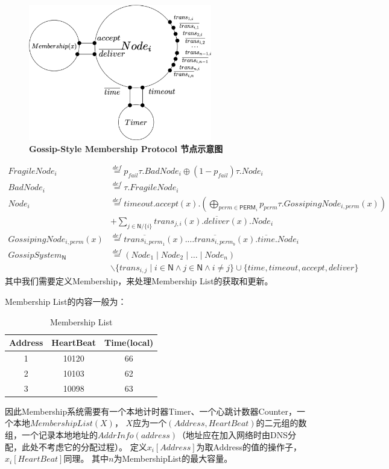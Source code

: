 \begin{figure}[!htbp]
	\small
	\centering
	\includegraphics[width=8cm]{../figure/Node.png}
    \caption{\textbf{Gossip-Style Membership Protocol 节点示意图}}
    \label{fig_membership_node}
\end{figure}
\begin{align*}
    FragileNode_i&\stackrel{def}{=}p_{fail}\tau.BadNode_i\oplus (1-p_{fail})\tau.Node_i\\
    BadNode_i&\stackrel{def}{=}\tau.FragileNode_i\\
    Node_i&\stackrel{def}{=}timeout.accept(x).(\bigoplus_{perm\in \mathsf{PERM}_i} p_{perm}\tau.GossipingNode_{i,perm}(x))\\
     &+\sum_{j\in \mathsf{N}/\{i\}}trans_{j,i}(x).\overline{deliver}(x).Node_i\\
    GossipingNode_{i,perm}(x)&\stackrel{def}{=}\overline{trans_{i,perm_{1}}}(x).\dots \overline{trans_{i,perm_{b}}}(x).\overline{time}.Node_i\\
    GossipSystem_\mathsf{N}&\stackrel{def}{=}(Node_1\mid Node_2\mid \dots \mid Node_n)\\
    &\backslash \{trans_{i,j}\mid i\in \mathsf{N} \wedge j\in \mathsf{N} \wedge i\neq j\}\cup \{time, timeout, accept, deliver\}
 \end{align*}
 其中我们需要定义Membership，来处理Membership List的获取和更新。

Membership List的内容一般为：
\begin{table}[!hpt]
    \caption[Membership List]{Membership List\footnotemark}
    \label{tab:secondone}
    \centering
    \begin{tabular}{@{}ccc@{}} \toprule
      Address & HeartBeat & Time(local) \\ \midrule
      1 & 10120 & 66\\
      2 & 10103 & 62\\
      3 & 10098 & 63\\ \bottomrule
    \end{tabular}
  \end{table}
因此Membership系统需要有一个本地计时器Timer、一个心跳计数器Counter，一个本地$MembershipList(X)$，
$X$应为一个$(Address, HeartBeat)$的二元组的数组，一个记录本地地址的$AddrInfo(address)$（地址应在加入网络时由DNS分配，此处不考虑它的分配过程）。
定义$x_i[Address]$为取Address的值的操作子，$x_i[HeartBeat]$同理。
其中$n$为MembershipList的最大容量。

